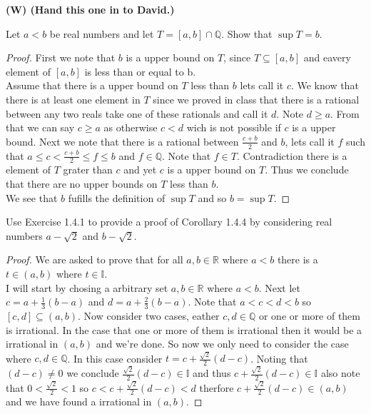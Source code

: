 \documentclass[12pt]{article}
\makeatletter
\theoremstyle{homework}
\newenvironment{exercise}[1]
{\def\@currentlabel{#1}\exercisecore}
{\endexercisecore}
\newcommand\W{{\color{red}\textbf{(W) (Hand this one in to David.)}}}
\newcommand{\Rats}{\ensuremath{\mathbb Q}}
\makeatother
\begin{document}
\begin{exercise}{1.4.4} \W 

Let $a<b$ be real numbers and let $T=[a,b]\cap\Rats$.
Show that $\sup T=b$.
\end{exercise}
\begin{proof}
First we note that $b$ is a upper bound on $T$, since $T\subseteq [a,b]$ and eavery element of $[a,b]$ is less than or equal to b.\\
Assume that there is a upper bound on $T$ less than $b$ lets call it $c$.  We know that there is at least one element in $T$ since we proved in class that there is a rational between any two reals take one of these rationals and call it $d$.  Note $d\geq a$.  From that we can say $c\geq a$ as otherwise $c<d$ wich is not possible if $c$ is a upper bound.  Next we note that there is a rational between $\frac{c+b}{2}$ and $b$, lets call it $f$ such that $a\leq c<\frac{c+b}{2}\leq f\leq b$ and $f\in\mathbb{Q}$.  Note that $f\in T$.  Contradiction there is a element of $T$ grater than $c$ and yet $c$ is a upper bound on $T$.  Thus we conclude that there are no upper bounds on $T$ less than $b$.\\
We see that $b$ fufills the definition of $\sup T$ and so $b=\sup T$.
\end{proof}

\begin{exercise}{1.4.5} Use Exercise 1.4.1 to provide a proof of Corollary 1.4.4 by considering real numbers $a-\sqrt{2}$ and $b-\sqrt{2}$.
\end{exercise}
\begin{proof}
We are asked to prove that for all $a,b\in\mathbb{R}$ where $a<b$ there is a $t\in (a,b)$ where $t\in \mathbb{I}$.\\
I will start by chosing a arbitrary set $a,b\in\mathbb{R}$ where $a<b$.  Next let $c=a+\frac{1}{3}(b-a)$ and $d=a+\frac{2}{3}(b-a)$.  Note that $a<c<d<b$ so $[c,d]\subseteq (a,b)$.  Now consider two cases, eather $c,d\in\mathbb{Q}$ or one or more of them is irrational.  In the case that one or more of them is irrational then it would be a irrational in $(a,b)$ and we're done.  So now we only need to consider the case where $c,d\in\mathbb{Q}$.  In this case consider $t=c+\frac{\sqrt{2}}{2}(d-c)$.  Noting that $(d-c)\neq 0$ we conclude $\frac{\sqrt{2}}{2}(d-c)\in \mathbb{I}$ and thus $c+\frac{\sqrt{2}}{2}(d-c)\in \mathbb{I}$ also note that $0<\frac{\sqrt{2}}{2}<1$ so $c<c+\frac{\sqrt{2}}{2}(d-c)<d$ therfore $c+\frac{\sqrt{2}}{2}(d-c)\in (a,b)$ and we have found a irrational in $(a,b)$.
\end{proof}
\end{document}
